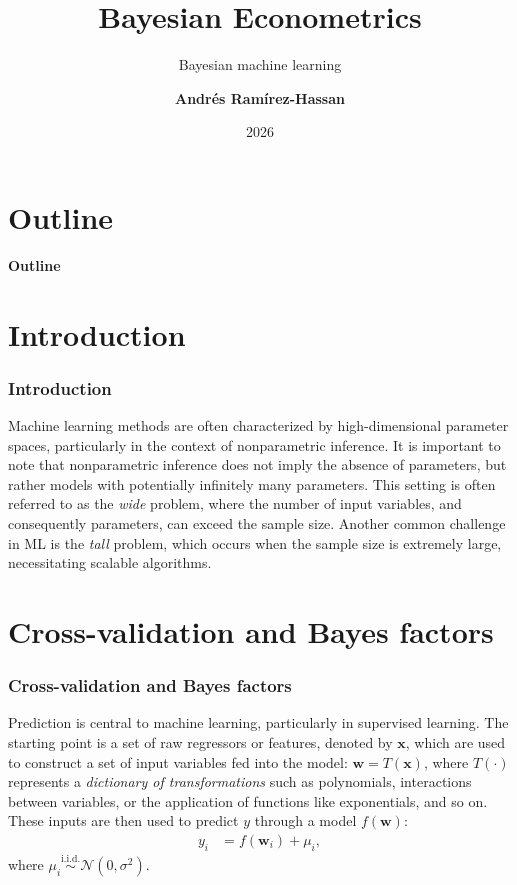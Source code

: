 \documentclass[12pt, compress]{beamer}
\title{Bayesian Econometrics}
\subtitle{Bayesian machine learning}
\date{2026}
\author[Andr\'e Ram\'irez H.]{\textbf{Andr\'es Ram\'irez-Hassan}}
\institute[EAFIT]{\small{Universidad EAFIT\\School of Finance, Economics and Government}}
\begin{document}
	
	\maketitle
	
	
	
	
	\section*{Outline}
	\begin{frame}
		\textbf{\Large{Outline}}
		\tableofcontents
	\end{frame}
	
\section{Introduction}
	
\begin{frame}
	\frametitle{Introduction}
Machine learning methods are often characterized by high-dimensional parameter spaces, particularly in the context of nonparametric inference. It is important to note that nonparametric inference does not imply the absence of parameters, but rather models with potentially infinitely many parameters. This setting is often referred to as the \textit{wide} problem, where the number of input variables, and consequently parameters, can exceed the sample size. Another common challenge in ML is the \textit{tall} problem, which occurs when the sample size is extremely large, necessitating scalable algorithms.
\end{frame}

\section{Cross-validation and Bayes factors}
\begin{frame}
	\frametitle{Cross-validation and Bayes factors}
Prediction is central to machine learning, particularly in supervised learning. The starting point is a set of raw regressors or features, denoted by \( \mathbf{x} \), which are used to construct a set of input variables fed into the model: \( \mathbf{w} = T(\mathbf{x}) \), where \( T(\cdot) \) represents a \textit{dictionary of transformations} such as polynomials, interactions between variables, or the application of functions like exponentials, and so on. These inputs are then used to predict \( y \) through a model \( f(\mathbf{w}) \):
\begin{align*}
	y_i &= f(\mathbf{w}_i) + \mu_i,
\end{align*}
where \( \mu_i \stackrel{\text{i.i.d.}}{\sim} \mathcal{N}(0, \sigma^2) \).
\end{frame}
\end{document}
